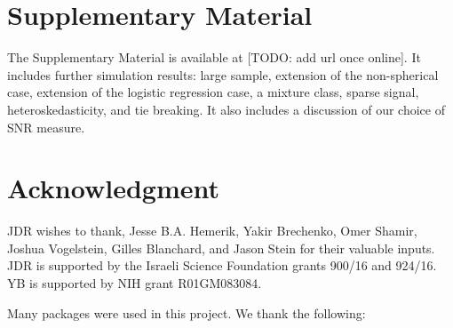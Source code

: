 \documentclass[oupdraft]{bio}
\begin{document}
\section{Supplementary Material}
The Supplementary Material is available at [TODO: add url once online]. 
It includes further simulation results: large sample, extension of the non-spherical case, extension of the logistic regression case, a mixture class, sparse signal, heteroskedasticity, and tie breaking. 
It also includes a discussion of our choice of SNR measure.



\section*{Acknowledgment}
JDR wishes to thank, Jesse B.A. Hemerik, Yakir Brechenko, Omer Shamir, Joshua Vogelstein, Gilles Blanchard, and Jason Stein for their valuable inputs. 
JDR is supported by the Israeli Science Foundation grants 900/16 and 924/16. 
YB is supported by NIH grant R01GM083084.

Many \R packages were used in this project. 
We thank the following:
\cite{mvtnorm,foreach,Hotelling,rpushbullet,sparsediscrim,glmnet,globaltest,kernlab,energy,hdtest}	

\newpage


\end{document}
